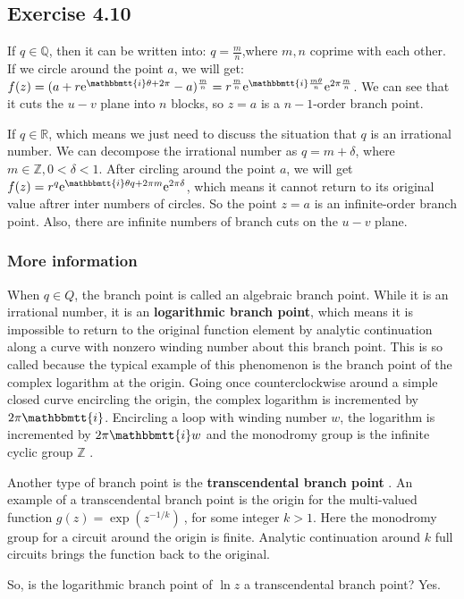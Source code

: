 \documentclass[]{ctexart}
\newcommand{\mi}{\mathbbmtt{i}}
\newcommand{\me}{\mathrm{e}}
\begin{document}
	\subsection{Exercise 4.10}
		If $q\in \mathbb{Q}$, then it can be written into: $q=\frac{m}{n}$,where $m,n$ coprime with each other. If we circle around the point $a$, we will get: $f(z)=(a+r\me^{\mi \theta+2\pi }-a)^{\frac{m}{n}}=r^{\frac{m}{n}}\me ^{\mi \frac{m\theta}{n}}\me ^{2\pi \frac{m}{n}}$. We can see that it cuts the $u-v$ plane into $n$ blocks, so $z=a$ is a $n-1$-order branch point. 
		
		If $q\in\mathbb{R}$, which means we just need to discuss the situation that $q$ is an irrational number. We can decompose the irrational number as $q=m+\delta$, where $m\in \mathbb{Z}, 0<\delta<1$. After circling around the point $a$, we will get $f(z)=r^{q}\me^{\mi \theta q+2\pi m}\me ^{2\pi \delta}$, which means it cannot return to its original value aftrer inter numbers of circles. So the point $z=a$ is an infinite-order branch point. Also, there are infinite numbers of branch cuts on the $u-v$ plane. 
		
		\subsubsection{More information}
			When $q\in Q$, the branch point is called an algebraic branch point.  While it is an irrational number, it is an \textbf{logarithmic branch point}, which means  it is impossible to return to the original function element by analytic continuation along a curve with nonzero winding number about this branch point. This is so called because the typical example of this phenomenon is the branch point of the complex logarithm at the origin. Going once counterclockwise around a simple closed curve encircling the origin, the complex logarithm is incremented by $ 2\pi \mi $. Encircling a loop with winding number $ w $, the logarithm is incremented by $ 2\pi\mi w $ and the monodromy group is the infinite cyclic group $ \mathbb {Z} $ . 
			
			Another type of branch point is the  \textbf{transcendental branch point} . An example of a transcendental branch point is the origin for the multi-valued function
			$g(z)=\exp \left(z^{-1/k}\right)\ $,
			for some integer $ k > 1 $. Here the monodromy group for a circuit around the origin is finite. Analytic continuation around $ k $ full circuits brings the function back to the original. 
			
			So, is the logarithmic branch point of $\ln z$ a transcendental branch point? Yes.  
	
\end{document}
